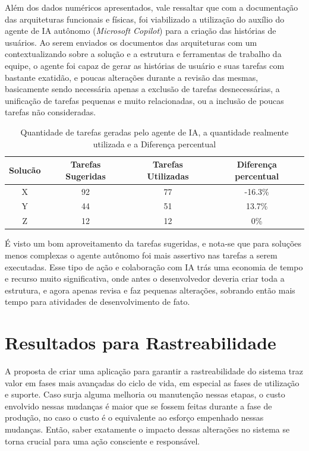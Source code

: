 	Além dos dados numéricos apresentados, vale ressaltar que com a documentação das arquiteturas funcionais e físicas, foi viabilizado a utilização do auxílio
	do agente de IA autônomo (\textit{Microsoft Copilot}) para a criação das histórias de usuários. Ao serem enviados os documentos das arquiteturas com um  contextualizando sobre a solução e
	a estrutura e ferramentas de trabalho da equipe, o agente foi capaz de gerar as histórias de usuário e suas tarefas com bastante exatidão, e poucas alterações durante a
	revisão das mesmas, basicamente sendo necessária apenas a exclusão de tarefas desnecessárias, a unificação de tarefas pequenas e muito relacionadas, ou a inclusão de poucas tarefas não consideradas.

	\begin{table}[!htb]
		\centering
		\begin{tabular}{cccc}
			\toprule
			\textbf{Solucão} & \textbf{Tarefas Sugeridas} & \textbf{Tarefas Utilizadas} & \textbf{Diferença percentual} \\
			\midrule
			X & 92  & 77 & -16.3\% \\
			Y & 44  & 51 & 13.7\% \\
			Z & 12  & 12 & 0\% \\
			\bottomrule
		\end{tabular}
		\caption{Quantidade de tarefas geradas pelo agente de IA, a quantidade realmente utilizada e a Diferença percentual}
		\label{tab:tarefas_copilot}
	\end{table}
	
	É visto um bom aproveitamento da tarefas sugeridas, e nota-se que para soluções menos complexas o agente autônomo foi mais assertivo nas tarefas a serem executadas. Esse tipo de
	ação e colaboração com IA trás uma economia de tempo e recurso muito significativa, onde antes o desenvolvedor deveria criar toda a estrutura, e agora apenas revisa e faz pequenas alterações,
	sobrando então mais tempo para atividades de desenvolvimento de fato.

	\section{Resultados para Rastreabilidade}

	A proposta de criar uma aplicação para garantir a rastreabilidade do sistema traz valor em fases mais avançadas do ciclo de vida, em especial as fases de utilização e suporte. Caso surja
	alguma melhoria ou manutenção nessas etapas, o custo envolvido nessas mudanças é maior que se fossem feitas durante a fase de produção, no caso o custo é o equivalente ao esforço empenhado nessas
	mudanças. Então, saber exatamente o impacto dessas alterações no sistema se torna crucial para uma ação consciente e responsável.

